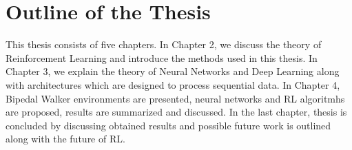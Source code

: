 \section{Outline of the Thesis}
\label{sec:outline}
This thesis consists of five chapters. 
In Chapter 2, we discuss the theory of Reinforcement Learning and introduce the methods used in this thesis.
In Chapter 3, we explain the theory of Neural Networks and Deep Learning along with architectures which are designed to process sequential data. 
In Chapter 4, Bipedal Walker environments are presented, neural networks and RL algoritmhs are proposed, results are summarized and discussed.
In the last chapter, thesis is concluded by discussing obtained results and possible future work is outlined along with the future of RL.

